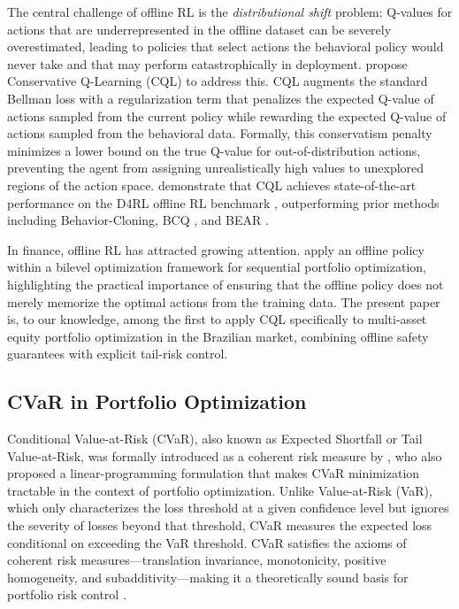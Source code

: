 The central challenge of offline RL is the \emph{distributional shift} problem:
Q-values for actions that are underrepresented in the offline dataset can be
severely overestimated, leading to policies that select actions the behavioral
policy would never take and that may perform catastrophically in deployment.
\citet{Kumar2020} propose Conservative Q-Learning (CQL) to address this.
CQL augments the standard Bellman loss with a regularization term that penalizes
the expected Q-value of actions sampled from the current policy while rewarding
the expected Q-value of actions sampled from the behavioral data.
Formally, this conservatism penalty minimizes a lower bound on the true Q-value
for out-of-distribution actions, preventing the agent from assigning unrealistically
high values to unexplored regions of the action space.
\citet{Kumar2020} demonstrate that CQL achieves state-of-the-art performance on
the D4RL offline RL benchmark \citep{Fu2020}, outperforming prior methods including
Behavior-Cloning, BCQ \citep{Fujimoto2019}, and BEAR \citep{Kumar2019}.

In finance, offline RL has attracted growing attention.
\citet{Yuan2025} apply an offline policy within a bilevel optimization framework
for sequential portfolio optimization, highlighting the practical importance of
ensuring that the offline policy does not merely memorize the optimal actions
from the training data.
The present paper is, to our knowledge, among the first to apply CQL specifically
to multi-asset equity portfolio optimization in the Brazilian market, combining
offline safety guarantees with explicit tail-risk control.

\subsection{CVaR in Portfolio Optimization}
\label{subsec:lit_cvar}

Conditional Value-at-Risk (CVaR), also known as Expected Shortfall or Tail
Value-at-Risk, was formally introduced as a coherent risk measure by
\citet{Rockafellar2000}, who also proposed a linear-programming formulation
that makes CVaR minimization tractable in the context of portfolio optimization.
Unlike Value-at-Risk (VaR), which only characterizes the loss threshold at a
given confidence level but ignores the severity of losses beyond that threshold,
CVaR measures the expected loss conditional on exceeding the VaR threshold.
CVaR satisfies the axioms of coherent risk measures---translation invariance,
monotonicity, positive homogeneity, and subadditivity---making it a theoretically
sound basis for portfolio risk control \citep{Artzner1999}.

